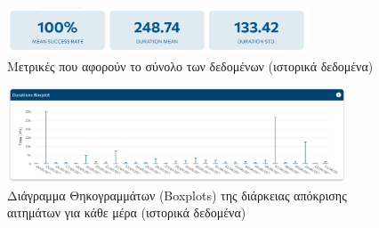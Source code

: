 \begin{figure}[!ht]
	\centering
	\includegraphics[width=0.8\textwidth]{./images/chapter5/metrics.png}
	\caption[Μετρικές που αφορούν το σύνολο των δεδομένων (ιστορικά δεδομένα)]{Μετρικές που αφορούν το σύνολο των δεδομένων (ιστορικά δεδομένα)}
	\label{fig:lychte_metrics}
\end{figure}

\begin{figure}[!ht]
	\centering
	\includegraphics[width=0.9\textwidth]{./images/chapter5/duration_boxplot_diagram.png}
	\caption[Διάγραμμα Θηκογραμμάτων (Boxplots) της διάρκειας απόκρισης αιτημάτων για κάθε μέρα (ιστορικά δεδομένα)]{Διάγραμμα Θηκογραμμάτων (Boxplots) της διάρκειας απόκρισης αιτημάτων για κάθε μέρα (ιστορικά δεδομένα)}
	\label{fig:lychte_boxplot}
\end{figure}
